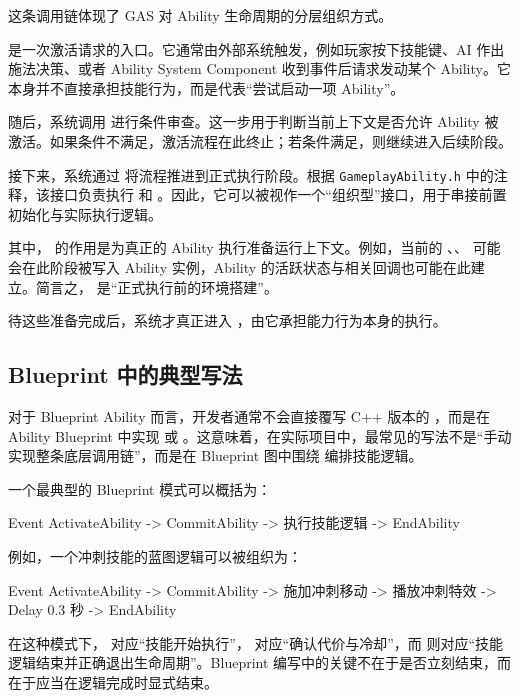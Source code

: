 这条调用链体现了 GAS 对 Ability 生命周期的分层组织方式。

 是一次激活请求的入口。它通常由外部系统触发，例如玩家按下技能键、AI 作出施法决策、或者 Ability System Component 收到事件后请求发动某个 Ability。它本身并不直接承担技能行为，而是代表“尝试启动一项 Ability”。

随后，系统调用  进行条件审查。这一步用于判断当前上下文是否允许 Ability 被激活。如果条件不满足，激活流程在此终止；若条件满足，则继续进入后续阶段。

接下来，系统通过  将流程推进到正式执行阶段。根据 \texttt{GameplayAbility.h} 中的注释，该接口负责执行  和 。因此，它可以被视作一个“组织型”接口，用于串接前置初始化与实际执行逻辑。

其中， 的作用是为真正的 Ability 执行准备运行上下文。例如，当前的 、、 可能会在此阶段被写入 Ability 实例，Ability 的活跃状态与相关回调也可能在此建立。简言之， 是“正式执行前的环境搭建”。

待这些准备完成后，系统才真正进入 ，由它承担能力行为本身的执行。

\subsection{Blueprint 中的典型写法}

对于 Blueprint Ability 而言，开发者通常不会直接覆写 C++ 版本的 ，而是在 Ability Blueprint 中实现  或 。这意味着，在实际项目中，最常见的写法不是“手动实现整条底层调用链”，而是在 Blueprint 图中围绕  编排技能逻辑。

一个最典型的 Blueprint 模式可以概括为：

\begin{code}
	Event ActivateAbility
	-> CommitAbility
	-> 执行技能逻辑
	-> EndAbility
\end{code}

例如，一个冲刺技能的蓝图逻辑可以被组织为：

\begin{code}
	Event ActivateAbility
	-> CommitAbility
	-> 施加冲刺移动
	-> 播放冲刺特效
	-> Delay 0.3 秒
	-> EndAbility
\end{code}

在这种模式下， 对应“技能开始执行”， 对应“确认代价与冷却”，而  则对应“技能逻辑结束并正确退出生命周期”。Blueprint 编写中的关键不在于是否立刻结束，而在于应当在逻辑完成时显式结束。

